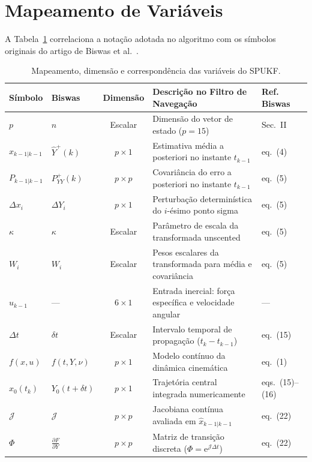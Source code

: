 \documentclass{article}
\begin{document}
\section*{Mapeamento de Vari\'aveis}

A Tabela~\ref{tab:mapa_variaveis} correlaciona a nota\c{c}\~ao adotada no algoritmo com os s\'imbolos originais do artigo de Biswas et al.~\cite{biswas2017}.

\begin{table}[htbp]
\centering
\small
\caption{Mapeamento, dimens\~ao e correspond\^encia das vari\'aveis do SPUKF.}
\label{tab:mapa_variaveis}
\begin{tabular}{llcp{6.8cm}l}
\toprule
\textbf{S\'imbolo} & \textbf{Biswas} & \textbf{Dimens\~ao} & \textbf{Descri\c{c}\~ao no Filtro de Navega\c{c}\~ao} & \textbf{Ref. Biswas} \\
\midrule
$p$ & $n$ & Escalar & Dimens\~ao do vetor de estado ($p = 15$) & Sec.~II \\
$\hat{x}_{k-1|k-1}$ & $\hat{Y}^+(k)$ & $p \times 1$ & Estimativa m\'edia a posteriori no instante $t_{k-1}$ & eq.~(4) \\
$P_{k-1|k-1}$ & $P_{YY}^+(k)$ & $p \times p$ & Covari\^ancia do erro a posteriori no instante $t_{k-1}$ & eq.~(5) \\
$\Delta x_i$ & $\Delta Y_i$ & $p \times 1$ & Perturba\c{c}\~ao determin\'istica do $i$-\'esimo ponto sigma & eq.~(5) \\
$\kappa$ & $\kappa$ & Escalar & Par\^ametro de escala da transformada unscented & eq.~(5) \\
$W_i$ & $W_i$ & Escalar & Pesos escalares da transformada para m\'edia e covari\^ancia & eq.~(5) \\
$u_{k-1}$ & --- & $6 \times 1$ & Entrada inercial: for\c{c}a espec\'ifica e velocidade angular & --- \\
$\Delta t$ & $\delta t$ & Escalar & Intervalo temporal de propaga\c{c}\~ao ($t_k - t_{k-1}$) & eq.~(15) \\
$f(x, u)$ & $f(t, Y, \nu)$ & $p \times 1$ & Modelo cont\'inuo da din\^amica cinem\'atica & eq.~(1) \\
$x_0(t_k)$ & $Y_0(t+\delta t)$ & $p \times 1$ & Trajet\'oria central integrada numericamente & eqs.~(15)--(16) \\
$\mathcal{J}$ & $\mathcal{J}$ & $p \times p$ & Jacobiana cont\'inua avaliada em $\hat{x}_{k-1|k-1}$ & eq.~(22) \\
$\Phi$ & $\frac{\partial F}{\partial Y}$ & $p \times p$ & Matriz de transi\c{c}\~ao discreta ($\Phi = \mathrm{e}^{\mathcal{J}\Delta t}$) & eq.~(22) \\

\end{tabular}
\end{table}
\end{document}
